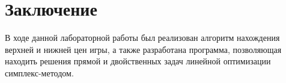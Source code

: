 \documentclass[14pt, titlepage,fleqn]{extarticle}
\begin{document}
    


	\newpage
	\section*{Заключение}
	В ходе данной лабораторной работы был реализован алгоритм нахождения верхней и нижней цен игры, а также разработана программа, позволяющая находить решения прямой и двойственных задач линейной оптимизации симплекс-методом.
\end{document}
